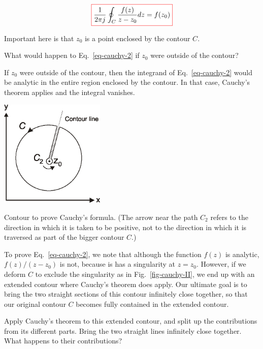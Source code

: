 \begin{equation}
\fbox{$\displaystyle
\frac{1}{2 \pi j}\oint_{{C}} \frac{f(z)} {z-z_0} dz = f(z_0)
\label{eq-cauchy-2}
$}
\end{equation}

Important here is that $z_0$ is a point enclosed by the contour ${C}$.

\begin{cue}
What would happen to Eq.~\ref{eq-cauchy-2} if  $z_0$ were outside of the contour?  
\end{cue}

If $z_0$ were outside of the contour, then the integrand of Eq.~\ref{eq-cauchy-2} would be analytic in the entire region enclosed by the contour. In that case, Cauchy's theorem applies and the integral vanishes.

\begin{marginfigure}[-1cm]
\centering
\includegraphics[width=5cm]{complex/figures/cauchy_II}
\caption{Contour to prove Cauchy's formula. (The arrow near the path $C_2$ refers to the direction in which it is taken to be positive, not to the direction in which it is traversed as part of the bigger contour $C$.)}
\label{fig-cauchy-II}
\end{marginfigure}

To prove Eq.~\ref{eq-cauchy-2}, we note that although the function $f(z)$ is analytic, $f(z)/(z-z_0)$ is not, because is has a singularity at $z=z_0$. However, if we deform ${C}$ to exclude the singularity as in Fig.~\ref{fig-cauchy-II}, we end up with an extended contour where Cauchy's theorem does apply. Our ultimate goal is to bring the two straight sections of this contour infinitely close together, so that our original contour $C$ becomes fully contained in the extended contour.

\begin{cue}
Apply Cauchy's theorem to this extended contour, and split up the contributions from its different parts. Bring the two straight lines infinitely close together. What happens to their contributions?
\end{cue}

